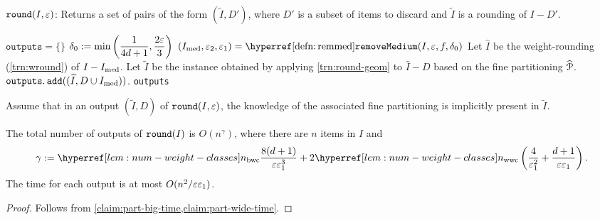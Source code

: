 \begin{algorithm}[htb]
\caption{$\operatorname{\mathtt{round}}(I, \varepsilon)$: Returns a set of pairs of the form $(\widetilde{I}, D')$,
where $D'$ is a subset of items to discard and $\widetilde{I}$ is a rounding of $I-D'$.}
\label{algo:round}
\begin{algorithmic}[1]
\State $\texttt{outputs} = \{\}$
\State $\delta_0 := {\displaystyle \min\left(\frac{1}{4d+1}, \frac{2\varepsilon}{3}\right)}$
\State $(\Imed, \epsSmall, \epsLarge) = \remMedHyp(I, \eps, f, \delta_0)$
\State Let $\widehat{I}$ be the weight-rounding (\cref{trn:wround}) of $I - I_{\mathrm{med}}$.
    \State Let $\widetilde{I}$ be the instance obtained by applying \cref{trn:round-geom}
        to $\widehat{I} - D$ based on the fine partitioning $\widehat{\mathcal{P}}$.
    \State $\operatorname{\mathtt{outputs.add}}((\widetilde{I}, D \cup I_{\mathrm{med}}))$.
\EndFor
\State \Return \texttt{outputs}
\end{algorithmic}
\end{algorithm}

Assume that in an output $(\widetilde{I}, D)$ of $\operatorname{\mathtt{round}}(I, \varepsilon)$,
the knowledge of the associated fine partitioning is implicitly present in $\widetilde{I}$.

\begin{lemma}
\label{lem:round-time}
The total number of outputs of $\operatorname{\mathtt{round}}(I)$ is $O(n^\gamma)$,
where there are $n$ items in $I$ and
\[ \gamma \defeq \nbwcHyp\frac{8(d+1)}{\eps\epsLarge^3}
    + 2\nwwcHyp\left(\frac{4}{\epsLarge^2} + \frac{d+1}{\eps\epsLarge}\right). \]
The time for each output is at most $O(n^2/\varepsilon\varepsilon_1)$.
\end{lemma}
\begin{proof}
Follows from \cref{claim:part-big-time,claim:part-wide-time}.
\end{proof}

